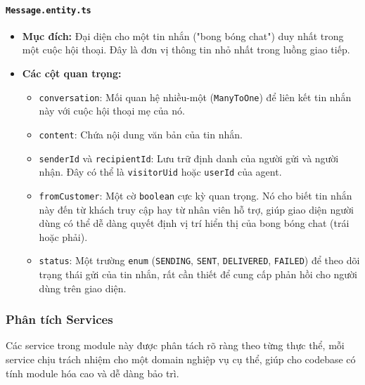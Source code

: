 \paragraph{\texttt{Message.entity.ts}}
\begin{itemize}
    \item \textbf{Mục đích:} Đại diện cho một tin nhắn ("bong bóng chat") duy nhất trong một cuộc hội thoại. Đây là đơn vị thông tin nhỏ nhất trong luồng giao tiếp.
    \item \textbf{Các cột quan trọng:}    
    \begin{itemize}
        \item \texttt{conversation}: Mối quan hệ nhiều-một (\texttt{ManyToOne}) để liên kết tin nhắn này với cuộc hội thoại mẹ của nó.
        \item \texttt{content}: Chứa nội dung văn bản của tin nhắn.
        \item \texttt{senderId} và \texttt{recipientId}: Lưu trữ định danh của người gửi và người nhận. Đây có thể là \texttt{visitorUid} hoặc \texttt{userId} của agent.
        \item \texttt{fromCustomer}: Một cờ \texttt{boolean} cực kỳ quan trọng. Nó cho biết tin nhắn này đến từ khách truy cập hay từ nhân viên hỗ trợ, giúp giao diện người dùng có thể dễ dàng quyết định vị trí hiển thị của bong bóng chat (trái hoặc phải).
        \item \texttt{status}: Một trường \texttt{enum} (\texttt{SENDING}, \texttt{SENT}, \texttt{DELIVERED}, \texttt{FAILED}) để theo dõi trạng thái gửi của tin nhắn, rất cần thiết để cung cấp phản hồi cho người dùng trên giao diện.
    \end{itemize}
\end{itemize}

\subsubsection{Phân tích Services}
\label{subsubsec:inbox-services}

Các service trong module này được phân tách rõ ràng theo từng thực thể, mỗi service chịu trách nhiệm cho một domain nghiệp vụ cụ thể, giúp cho codebase có tính module hóa cao và dễ dàng bảo trì.

